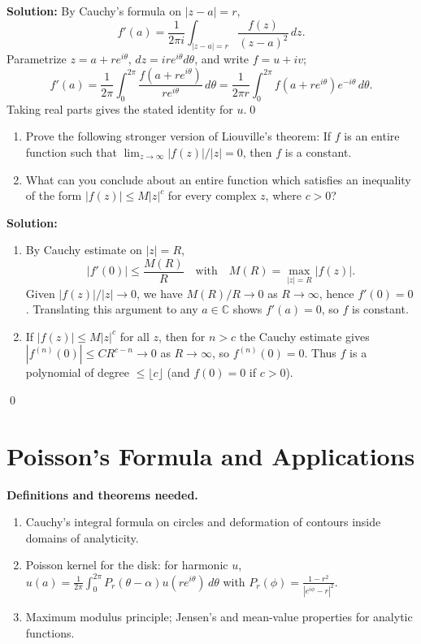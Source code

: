 \noindent\textbf{Solution:}
By Cauchy's formula on $|z-a|=r$,
\[f'(a)=\frac{1}{2\pi i}\int_{|z-a|=r} \frac{f(z)}{(z-a)^2}\,dz.\]
Parametrize $z=a+re^{i\theta}$, $dz=ire^{i\theta}d\theta$, and write $f=u+iv$;
\[f'(a)=\frac{1}{2\pi}\int_0^{2\pi} \frac{f(a+re^{i\theta})}{re^{i\theta}}\,d\theta=\frac{1}{2\pi r}\int_0^{2\pi} f(a+re^{i\theta})e^{-i\theta}\,d\theta.\]
Taking real parts gives the stated identity for $u$.\qed


\begin{problembox}
\begin{enumerate}[label=(\alph*)]
\item Prove the following stronger version of Liouville's theorem: If \( f \) is an entire function such that \( \lim_{z \to \infty} |f(z)|/|z| = 0 \), then \( f \) is a constant.
\item What can you conclude about an entire function which satisfies an inequality of the form \( |f(z)| \leq M|z|^c \) for every complex \( z \), where \( c > 0 \)?
\end{enumerate}
\end{problembox}

\noindent\textbf{Solution:}
\begin{enumerate}[label=(\alph*)]
\item By Cauchy estimate on $|z|=R$,
\[|f'(0)|\le \frac{M(R)}{R} \quad\text{with}\quad M(R)=\max_{|z|=R}|f(z)|.\]
Given $|f(z)|/|z|\to0$, we have $M(R)/R\to0$ as $R\to\infty$, hence $f'(0)=0$. Translating this argument to any $a\in\mathbb C$ shows $f'(a)=0$, so $f$ is constant.
\item If $|f(z)|\le M|z|^c$ for all $z$, then for $n>c$ the Cauchy estimate gives $|f^{(n)}(0)|\le C R^{c-n}\to0$ as $R\to\infty$, so $f^{(n)}(0)=0$. Thus $f$ is a polynomial of degree $\le \lfloor c\rfloor$ (and $f(0)=0$ if $c>0$).
\end{enumerate}\qed
\section{Poisson's Formula and Applications}

\noindent\textbf{Definitions and theorems needed.}
\begin{enumerate}[label=(\alph*)]
\item Cauchy's integral formula on circles and deformation of contours inside domains of analyticity.
\item Poisson kernel for the disk: for harmonic $u$, $u(a)=\frac{1}{2\pi}\int_0^{2\pi} P_r(\theta-\alpha)u(re^{i\theta})\,d\theta$ with $P_r(\phi)=\frac{1-r^2}{|e^{i\phi}-r|^2}$.
\item Maximum modulus principle; Jensen's and mean-value properties for analytic functions.
\end{enumerate}



